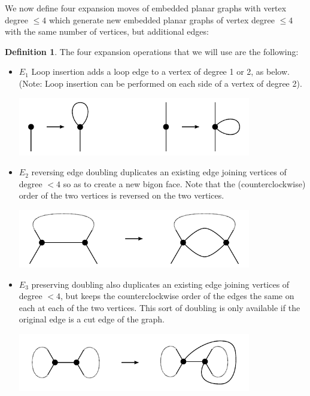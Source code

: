 \documentclass[amsmath,secnumarabic,floatfix,amssymb,nofootinbib,nobibnotes,letterpaper,11pt,tightenlines,showkeys]{revtex4}
\theoremstyle{definition}
\newtheorem{definition}[theorem]{Definition}
\newcommand{\loopinsert}{E_1}
\newcommand{\edgedouble}{E_2}
\newcommand{\cutedgedouble}{E_3}
\begin{document}
We now define four expansion moves of embedded planar graphs with vertex degree $\leq 4$ which generate new embedded planar graphs of vertex degree $\leq 4$ with the same number of vertices, but additional edges:
\begin{definition}
The four expansion operations that we will use are the following:
\begin{itemize}
\item $\loopinsert$ Loop insertion adds a loop edge to a vertex of degree 1 or 2, as below. (Note: Loop insertion can be performed on each side of a vertex of degree 2).
  \begin{center}
    \includegraphics[width=4in]{loop-addition.pdf}
  \end{center}
\item $\edgedouble$ reversing edge doubling duplicates an existing edge joining vertices of degree $< 4$ so as to create a new bigon face. Note that the (counterclockwise) order of the two vertices is reversed on the two vertices.
  \begin{center}
    \includegraphics[width=4in]{edge-duplication-non-cut.pdf}
  \end{center}
\item $\cutedgedouble$ preserving doubling also duplicates an existing edge joining vertices of degree $<4$, but
keeps the counterclockwise order of the edges the same on each at each of the two vertices. This sort of doubling is only available if the original edge is a cut edge of the graph.
\begin{center}
  \includegraphics[width=4in]{edge-duplication-cut.pdf}
\end{center}

\end{itemize}
\end{definition}
\end{document}
